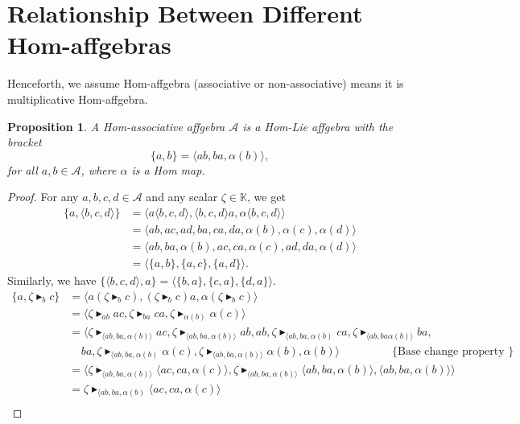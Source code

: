 \documentclass[14pt]{article}
\newtheorem{Prop}[thm]{Proposition}
\theoremstyle{Definition}
\theoremstyle{remark}
\begin{document}
\section{Relationship Between Different Hom-affgebras}
Henceforth, we assume Hom-affgebra (associative or non-associative) means it is multiplicative Hom-affgebra.
\begin{Prop}\label{Prop1}
A Hom-associative affgebra $\mathcal{A}$ is a Hom-Lie affgebra with the bracket
$$
\{a,b\}=\langle ab,ba,\alpha(b)\rangle,
$$
for all $a,b\in \mathcal{A}$, where $\alpha$ is a Hom map.
\end{Prop}
\begin{proof}
For any $a,b,c,d\in \mathcal{A}$ and any scalar $\zeta\in \mathbb{K}$, we get
\begin{align*}
\{a,\langle b,c,d\rangle\}&=\langle a\langle b,c,d\rangle,\langle b,c,d\rangle a,\alpha\langle b,c,d\rangle\rangle\\
&=\langle ab,ac,ad,ba,ca,da,\alpha(b),\alpha(c),\alpha(d)\rangle\\
&=\langle ab,ba,\alpha(b),ac,ca,\alpha(c),ad,da,\alpha(d)\rangle\\
&=\langle \{a,b\},\{a,c\},\{a,d\}\rangle.
\end{align*}
Similarly, we have $\{\langle b,c,d\rangle,a\}=\langle\{b,a\},\{c,a\},\{d,a\}\rangle$.
\begin{align*}
\{a,\zeta\blacktriangleright_{b}c\}&=\langle a(\zeta\blacktriangleright_{b}c),(\zeta\blacktriangleright_{b}c)a,\alpha(\zeta\blacktriangleright_{b}c)\rangle\\
&=\langle \zeta\blacktriangleright_{ab}ac,\zeta\blacktriangleright_{ba}ca,\zeta\blacktriangleright_{\alpha(b)}\alpha(c)\rangle\\
&=\langle \zeta\blacktriangleright_{\langle ab,ba,\alpha(b)\rangle}ac,\zeta\blacktriangleright_{\langle ab,ba,\alpha(b)\rangle}ab,ab,\zeta\blacktriangleright_{\langle ab,ba,\alpha(b)}ca,\zeta\blacktriangleright_{\langle ab,ba \alpha(b)\rangle}ba,\\
&~~~~~ba,\zeta\blacktriangleright_{\langle ab,ba,\alpha(b)}\alpha(c),\zeta\blacktriangleright_{\langle ab,ba,\alpha(b)\rangle}\alpha(b),\alpha(b)\rangle~~~~~~~~~~~~~~~~~~~~~\text{\{Base change property \} }\\
&=\langle\zeta\blacktriangleright_{\langle ab,ba,\alpha(b)\rangle}\langle ac,ca,\alpha(c)\rangle,\zeta\blacktriangleright_{\langle ab,ba,\alpha(b)\rangle}\langle ab,ba,\alpha(b)\rangle,\langle ab,ba,\alpha(b)\rangle\rangle\\
&=\zeta\blacktriangleright_{\langle ab,ba,\alpha(b)}\langle ac,ca,\alpha(c)\rangle\\

\end{align*}
\end{proof}
\end{document}
